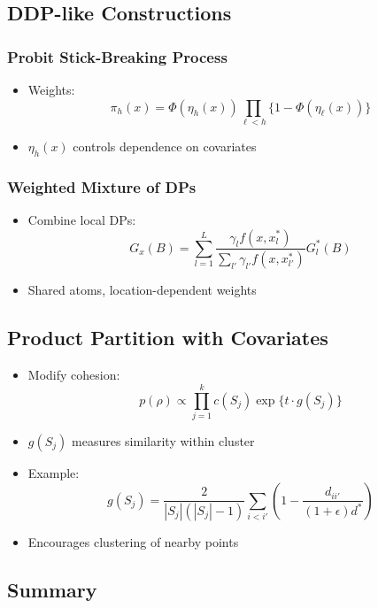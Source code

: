 \documentclass[12pt,oneside]{book}
\numberwithin{equation}{section}
\theoremstyle{definition}
\theoremstyle{plain}
\theoremstyle{remark}
\begin{document}
\subsection{DDP-like Constructions}

\subsubsection*{Probit Stick-Breaking Process}

\begin{itemize}
\item Weights:
\[
\pi_h(x) = \Phi(\eta_h(x)) \prod_{\ell<h} \{1 - \Phi(\eta_\ell(x))\}
\]

\item $\eta_h(x)$ controls dependence on covariates
\end{itemize}

\subsubsection*{Weighted Mixture of DPs}

\begin{itemize}
\item Combine local DPs:
\[
G_x(B) = \sum_{l=1}^L \frac{\gamma_l f(x,x_l^*)}{\sum_{l'} \gamma_{l'} f(x,x_{l'}^*)} G_l^*(B)
\]

\item Shared atoms, location-dependent weights
\end{itemize}

\subsection*{Product Partition with Covariates}

\begin{itemize}
\item Modify cohesion:
\[
p(\rho) \propto \prod_{j=1}^k c(S_j) \exp\{t \cdot g(S_j)\}
\]

\item $g(S_j)$ measures similarity within cluster

\item Example:
\[
g(S_j) =
\frac{2}{|S_j|(|S_j|-1)}
\sum_{i<i'} \left(1 - \frac{d_{ii'}}{(1+\epsilon)d^*}\right)
\]

\item Encourages clustering of nearby points
\end{itemize}

\subsection*{Summary}
\end{document}
